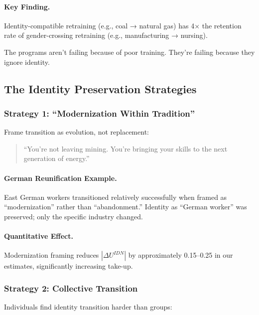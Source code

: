 \paragraph{Key Finding.}
Identity-compatible retraining (e.g., coal → natural gas) has 4× the 
retention rate of gender-crossing retraining (e.g., manufacturing → nursing).

The programs aren't failing because of poor training. They're failing 
because they ignore identity.

\subsection{The Identity Preservation Strategies}

\subsubsection{Strategy 1: ``Modernization Within Tradition''}

Frame transition as evolution, not replacement:

\begin{quote}
``You're not leaving mining. You're bringing your skills to the next 
generation of energy.''
\end{quote}

\paragraph{German Reunification Example.}
East German workers transitioned relatively successfully when framed as 
``modernization'' rather than ``abandonment.'' Identity as ``German worker'' 
was preserved; only the specific industry changed.

\paragraph{Quantitative Effect.}
Modernization framing reduces $|\Delta U^{IDN}|$ by approximately 0.15--0.25 
in our estimates, significantly increasing take-up.

\subsubsection{Strategy 2: Collective Transition}

Individuals find identity transition harder than groups:

